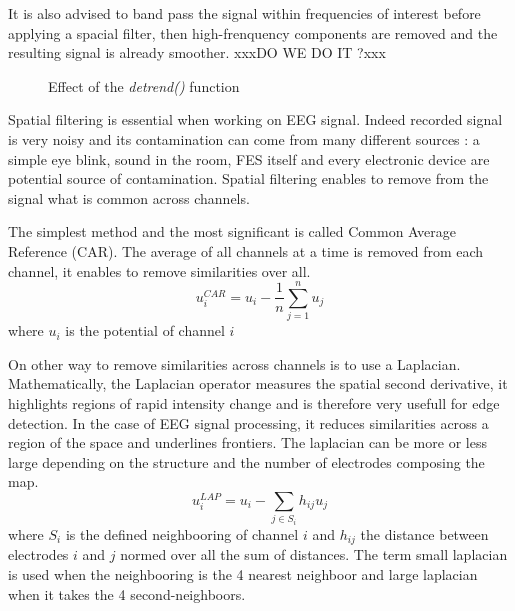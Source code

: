 \documentclass{article} %
\begin{document}
It is also advised to band pass the signal within frequencies of interest before applying a spacial filter, then high-frenquency components are removed and the resulting signal is already smoother. xxxDO WE DO IT ?xxx


\begin{figure}
\begin{center}
\quad
{}
\end{center}
\caption{Effect of the \textit{detrend()} function}
\label{Off_detrend}
\end{figure}

Spatial filtering is essential when working on EEG signal. Indeed recorded signal is very noisy and its contamination can come from many different sources : a simple eye blink, sound in the room, FES itself and every electronic device are potential source of contamination. Spatial filtering enables to remove from the signal what is common across channels.

The simplest method and the most significant is called Common Average Reference (CAR). The average of all channels at a time is removed from each channel, it enables to remove similarities over all. \begin{equation}
u_i^{CAR} = u_i - \frac{1}{n} \sum_{j=1}^n u_j
\end{equation}
where $u_i$ is the potential of channel $i$

On other way to remove similarities across channels is to use a Laplacian. Mathematically, the Laplacian operator measures the spatial second derivative, it highlights regions of rapid intensity change and is therefore very usefull for edge detection. In the case of  EEG signal processing, it reduces similarities across a region of the space and underlines frontiers. The laplacian can be more or less large depending on the structure and the number of electrodes composing the map. \begin{equation}
u_i^{LAP} = u_i- \sum_{j \in S_i} h_{ij} u_j
\end{equation}
where $S_i$ is the defined neighbooring of channel $i$ and $h_{ij}$ the distance between electrodes $i$ and $j$ normed over all the sum of distances. The term small laplacian is used when the neighbooring is the 4 nearest neighboor and large laplacian when it takes the 4 second-neighboors.
\end{document}
